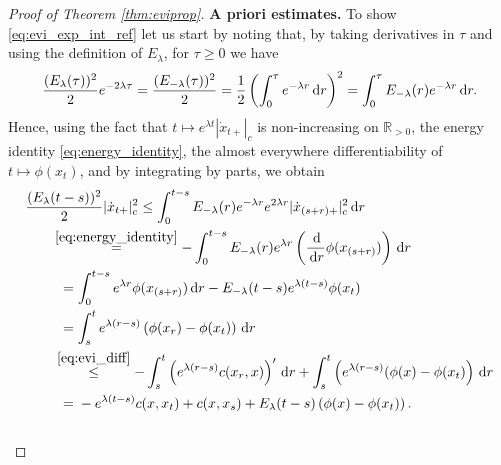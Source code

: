 \documentclass[reqno]{amsart}
\theoremstyle{plain}
\theoremstyle{remark}
\theoremstyle{plain}
\numberwithin{equation}{section}
\theoremstyle{remark}
\newcommand{\R}{\mathbb{R}}
\newcommand{\tb}{\textbf}
\newcommand{\de}{{\,\rm d}}
\begin{document}
\begin{proof}[Proof of Theorem \ref{thm:eviprop}]
    \tb{\bf A priori estimates.}  To show \eqref{eq:evi_exp_int_ref}  let us start by  noting   that, by taking derivatives in $\tau$ and using the definition of $E_\lambda$, for $\tau \ge 0$ we have
\begin{equation*}
    \frac{(E_{\lambda}(\tau))^2}{2}e^{-2\lambda \tau}=\frac{(E_{-\lambda}(\tau))^2}{2}=\frac{1}{2} \left(\int_0^\tau e^{-\lambda r} \de r\right)^2= \int_0^\tau E_{-\lambda}(r) e^{-\lambda r} \de r.
\end{equation*}
     Hence, using the  fact that $t\mapsto e^{\lambda t}|\dot x_{t+ }|_c$  is non-increasing on $\R_{>0}$,  the   energy identity  \eqref{eq:energy_identity},   the almost everywhere differentiability of  $t \mapsto \phi(x_t)$, and  by  integrating by parts, we obtain
    \begin{align*}
        \frac{(E_\lambda(t-s))^2}{2}|\dot x_{t+ }|_c^2
         &\le \int_0^{t-s} E_{-\lambda}(r) e^{-\lambda r} e^{2\lambda r}|\dot x_{(s+r)+ }|_c^2 \de r \\
         & \hspace{-2.2cm} \stackrel{\eqref{eq:energy_identity}}{ = }  -\int_0^{t-s} E_{-\lambda}(r) e^{\lambda r}\left( \frac{\de}{\de r}\phi(x_{(s+r)})\right) \de r\\
        &\hspace{-2cm}=\int_0^{t-s}  e^{\lambda r} \phi(x_{(s+r)}) \de r- E_{-\lambda}(t-s) e^{\lambda (t-s)}\phi(x_t)\\
        &\hspace{-2cm}=\int_s^{t} e^{\lambda (r-s)}\left(\phi(x_r)-\phi(x_t)\right) \de r \\
         &\hspace{-2.15cm} \stackrel{\eqref{eq:evi_diff}}{\le }  -\int_s^t \left(e^{\lambda (r-s)} c(x_r,x)\right )' \de r + \int_s^t \left(e^{\lambda (r-s)}(\phi(x)-\phi(x_t) \right ) \de r \\
        &\hspace{-2cm} = {}-e^{\lambda(t-s)}c(x,x_t)+c(x,x_s) + E_\lambda(t-s)\left(\phi(x)-\phi(x_t)\right).
    \end{align*}\\
    

\end{proof}
\end{document}
